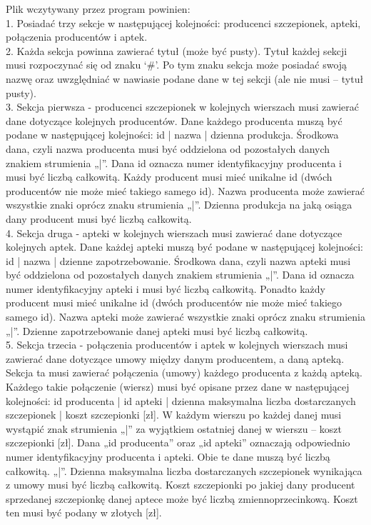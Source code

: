 \documentclass{article}
\begin{document}
Plik wczytywany przez program powinien:\\
1.	Posiadać trzy sekcje w następującej kolejności: producenci szczepionek, apteki, połączenia producentów i aptek.\\
2.	Każda sekcja powinna zawierać tytuł (może być pusty). Tytuł każdej sekcji musi rozpoczynać się od znaku ‘#’. Po tym znaku sekcja może posiadać swoją nazwę oraz uwzględniać w nawiasie podane dane w tej sekcji (ale nie musi – tytuł pusty).\\
3.	Sekcja pierwsza - producenci szczepionek w kolejnych wierszach musi zawierać dane dotyczące kolejnych producentów. Dane każdego producenta muszą być podane w następującej kolejności: id | nazwa | dzienna produkcja. Środkowa dana, czyli nazwa producenta musi być oddzielona od pozostałych danych znakiem strumienia „|”. Dana id oznacza numer identyfikacyjny producenta i musi być liczbą całkowitą. Każdy producent musi mieć unikalne id (dwóch producentów nie może mieć takiego samego id). Nazwa producenta może zawierać wszystkie znaki oprócz znaku strumienia „|”. Dzienna produkcja na jaką osiąga dany producent musi być liczbą całkowitą.\\
4.	Sekcja druga - apteki w kolejnych wierszach musi zawierać dane dotyczące kolejnych aptek. Dane każdej apteki muszą być podane w następującej kolejności: id | nazwa | dzienne zapotrzebowanie. Środkowa dana, czyli nazwa apteki musi być oddzielona od pozostałych danych znakiem strumienia „|”. Dana id oznacza numer identyfikacyjny apteki i musi być liczbą całkowitą. Ponadto każdy producent musi mieć unikalne id (dwóch producentów nie może mieć takiego samego id). Nazwa apteki może zawierać wszystkie znaki oprócz znaku strumienia „|”. Dzienne zapotrzebowanie danej apteki musi być liczbą całkowitą.\\
5.	Sekcja trzecia - połączenia producentów i aptek w kolejnych wierszach musi zawierać dane dotyczące umowy między danym producentem, a daną apteką. Sekcja ta musi zawierać połączenia (umowy) każdego producenta z każdą apteką. Każdego takie połączenie (wiersz) musi być opisane przez dane w następującej kolejności: id producenta | id apteki | dzienna maksymalna liczba dostarczanych szczepionek | koszt szczepionki [zł]. W każdym wierszu po każdej danej musi wystąpić znak strumienia „|” za wyjątkiem ostatniej danej w wierszu – koszt szczepionki [zł].  Dana „id producenta” oraz „id apteki” oznaczają odpowiednio numer identyfikacyjny producenta i apteki. Obie te dane muszą być liczbą całkowitą. „|”. Dzienna maksymalna liczba dostarczanych szczepionek wynikająca z umowy musi być liczbą całkowitą. Koszt szczepionki po jakiej dany producent sprzedanej szczepionkę danej aptece może być liczbą zmiennoprzecinkową. Koszt ten musi być podany w złotych [zł].\\
\end{document}
